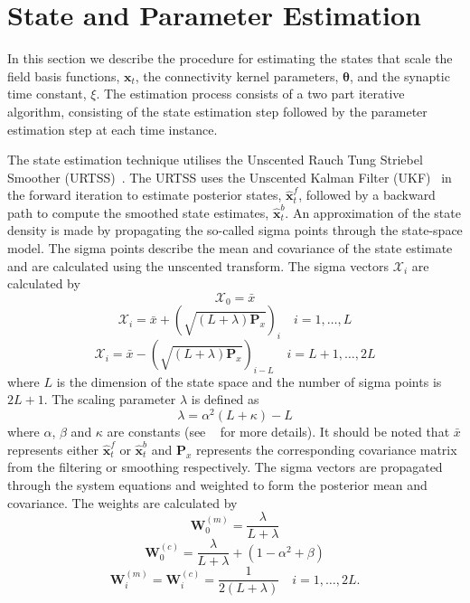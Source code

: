\documentclass[12pt]{iopart}
\begin{document}
% 
\section{State and Parameter Estimation}\label{StateAndParameterEstimationSection} In this section we describe the procedure for estimating the states that scale the field basis functions, $\mathbf{x}_t$, the connectivity kernel parameters, $\boldsymbol \theta$, and the synaptic time constant, $\xi$. The estimation process consists of a two part iterative algorithm, consisting of the state estimation step followed by the parameter estimation step at each time instance. 

The state estimation technique utilises the Unscented Rauch Tung Striebel Smoother (URTSS)~\cite{Sarkka2010}. The URTSS uses the Unscented Kalman Filter (UKF)~\cite{Julier1997} in the forward iteration to estimate posterior states, $\hat{\mathbf x}_t^{f}$, followed by a backward path to compute the smoothed state estimates, $\hat{\mathbf x}_t^{b}$. An approximation of the state density is made by propagating the so-called sigma points through the state-space model. The sigma points describe the mean and covariance of the state estimate and are calculated using the unscented transform. The sigma vectors $\mathcal X_i$ are calculated by 
\begin{equation}
	\mathcal X_{0}=\bar x 
\end{equation}
\begin{equation}
	\mathcal X_{i}=\bar x+(\sqrt{( L + \lambda)\mathbf P_x})_i \quad i=1, \dots, L 
\end{equation}
\begin{equation}
	\mathcal X_{i}=\bar x-(\sqrt{( L + \lambda)\mathbf P_x})_{i- L} \quad i= L+1, \dots, 2 L 
\end{equation}
where $L$ is the dimension of the state space and the number of sigma points is $2L+1$. The scaling parameter $\lambda$ is defined as 
\begin{equation}
	\lambda=\alpha^2( L+\kappa)- L 
\end{equation}
where $\alpha$, $\beta$ and $\kappa$ are constants (see ~\cite{Haykin2001} for more details). It should be noted that $\bar x$ represents either $\hat{\mathbf x}_t^{f}$ or $\hat{\mathbf x}_t^{b}$ and $\mathbf{P}_x$ represents the corresponding covariance matrix from the filtering or smoothing respectively. The sigma vectors are propagated through the system equations and weighted to form the posterior mean and covariance. The weights are calculated by 
\begin{equation}
	\mathbf W_0^{(m)}=\frac{\lambda}{ L+\lambda} 
\end{equation}
\begin{equation}
	\mathbf W_0^{(c)}=\frac{\lambda}{ L+\lambda}+(1-\alpha^2+\beta) 
\end{equation}
\begin{equation}
	\mathbf W_i^{(m)}=\mathbf W_i^{(c)}=\frac{1}{2( L+\lambda)} \quad i=1, \dots, 2L. 
\end{equation}
\end{document}
